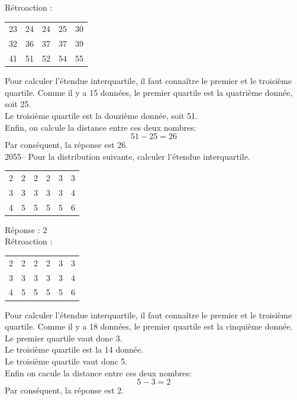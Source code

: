 \documentclass[letterpaper, 12pt]{article}
\begin{document}
R\'etroaction :
\begin{center}
 \begin{tabular}{|c  c  c  c  c|} \hline

23 & 24 & 24 & 25 & 30\\
32 & 36 & 37 & 37 & 39 \\
41 & 51 & 52 & 54 & 55 \\ \hline

\end{tabular}
\end{center}
Pour calculer l'\'etendue interquartile, il faut conna\^itre le premier et le troisi\`eme quartile. Comme il y a 15 donn\'ees, le premier quartile est la quatri\`eme donn\'ee, soit 25.\\
Le troisi\`eme quartile est la douzi\`eme donn\'ee, soit 51.\\
Enfin, on calcule la distance entre ces deux nombres:\\
\begin{equation*}
 51-25=26
\end{equation*}
Par cons\'equent, la r\'eponse est 26.\\

2055-- Pour la distribution suivante, calculer l'\'etendue interquartile.
\begin{center}
 \begin{tabular}{|c  c  c  c  c  c |} \hline

2 & 2 & 2 & 2 & 3 & 3 \\
3 & 3 & 3 & 3 & 3 & 4 \\
4 & 5 & 5 & 5 & 5 & 6 \\ \hline

\end{tabular}
\end{center}

R\'eponse : 2\\

R\'etroaction :
\begin{center}
 \begin{tabular}{|c  c  c  c  c  c |} \hline

2 & 2 & 2 & 2 & 3 & 3 \\
3 & 3 & 3 & 3 & 3 & 4 \\
4 & 5 & 5 & 5 & 5 & 6 \\ \hline

\end{tabular}
\end{center}
Pour calculer l'\'etendue interquartile, il faut conna\^itre le premier et le troisi\`eme quartile. Comme il y a 18 donn\'ees, le premier quartile est la cinqui\`eme donn\'ee.\\
Le premier quartile vaut donc 3.\\
Le troisi\`eme quartile est la 14\ieme{} donn\'ee.\\
Le troisi\`eme quartile vaut donc 5.\\
Enfin on cacule la distance entre ces deux nombres:\\
\begin{equation*}
 5-3=2
\end{equation*}
Par cons\'equent, la r\'eponse est 2.\\
\end{document}
